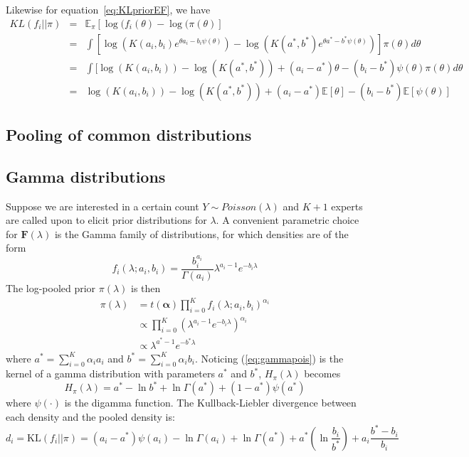 \documentclass[a4paper, notitlepage, 10pt]{article}
\begin{document}
Likewise for equation~\ref{eq:KLpriorEF}, we have 
\begin{eqnarray*} 
KL(f_i || \pi) & = & \mathbb{E}_\pi[\log(f_i(\theta)-\log(\pi(\theta)] \\
              & = & \int [\log( K(a_i,b_i) e^{\theta a_i - b_i \psi(\theta)}) - \log(K(a^*,b^*) e^{\theta a^* - b^* \psi(\theta)}) ] \pi(\theta) d\theta \\
              & = & \int [\log( K(a_i,b_i)) - \log(K(a^*,b^*)) + (a_i - a^*) \theta  - (b_i - b^*) \psi(\theta) \pi(\theta) d\theta \\
              & = & \log( K(a_i,b_i)) - \log(K(a^*,b^*)) + (a_i - a^*) \mathbb{E}[\theta] - (b_i - b^*) \mathbb{E}[\psi(\theta)] 
\end{eqnarray*}

\subsection*{Pooling of common distributions}


\subsection*{Gamma distributions}
\label{sec:gamma}
Suppose we are interested in a certain count $Y\sim Poisson(\lambda)$ and $K + 1$ experts are called upon to elicit prior distributions for $\lambda$.
A convenient parametric choice for $\mathbf{F}(\lambda)$ is the Gamma family of distributions, for which densities are of the form
$$ f_i(\lambda;a_i,b_i) = \frac{b_i^{a_i}}{\Gamma(a_i)} \lambda^{a_i-1} e^{-b_i\lambda}$$
The log-pooled prior $\pi(\lambda)$ is then
\begin{align}
\pi(\lambda)&= t(\boldsymbol\alpha)\prod_{i=0}^{K}f_i(\lambda;a_i,b_i)^{\alpha_i}\\
&\propto \prod_{i=0}^{K} \left(\lambda^{a_i-1} e^{-b_i\lambda}\right)^{\alpha_i}\\
\label{eq:gammapois}
&\propto \lambda^{a^*-1} e^{-b^*\lambda}
\end{align}
where $a^* =\sum_{i=0}^{K}\alpha_ia_i$ and $b^* = \sum_{i=0}^{K}\alpha_ib_i$.
Noticing (\ref{eq:gammapois}) is the kernel of a gamma distribution with parameters $a^*$ and $b^*$, $H_{\pi}(\lambda)$ becomes
\begin{equation}
\label{eq:entropygamma}
H_{\pi}(\lambda) = a^* - \ln b^* + \ln \Gamma(a^*) + (1-a^*)\psi(a^*)
\end{equation}
where $\psi(\cdot)$ is the digamma function.
 The Kullback-Liebler divergence between each density and the pooled density is:
\begin{equation}
 \label{eq:KLgamma}
 d_i = \text{KL}(f_i||\pi) = (a_i-a^*)\psi(a_i) - \ln\Gamma(a_i) + \ln\Gamma(a^*) + a^*(\ln\frac{b_i}{b^*}) + a_i\frac{b^*-b_i}{b_i}
\end{equation}
\end{document}
